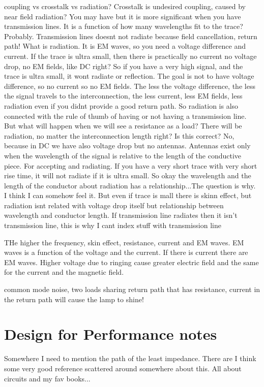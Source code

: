 \documentclass[12pt]{article}
\begin{document}
coupling vs crosstalk vs radiation?
Crosstalk is undesired coupling, caused by near field radiation?
You may have but it is more significant when you have transmission lines. It is a function of how many wavelengths fit to the trace? Probably. Transmission lines doesnt not radiate because field cancellation, return path! What is radiation. It is EM waves, so you need a voltage difference and current. If the trace is ultra small, then there is practically no current no voltage drop, no EM fields, like DC right? So if you have a very high signal, and the trace is ultra small, it wont radiate or reflection. The goal is not to have voltage difference, so no current so no EM fields. The less the voltage difference, the less the signal travels to the interconnection, the less current, less EM fields, less radiation even if you didnt provide a good return path. So radiation is also connected with the rule of thumb of having or not having a transmission line. But what will happen when we will see a resistance as a load? There will be radiation, no matter the interconnection length right? Is this correct? No, because in DC we have also voltage drop but no antennas. Antennas exist only when the wavelength of the signal is relative to the length of the conductive piece. For accepting and radiating. If you have a very short trace with very short rise time, it will not radiate if it is ultra small. So okay the wavelength and the length of the conductor about radiation has a relationship...The question is why. I think I can somehow feel it. But even if trace is mall there is skinn effect, but radiation isnt related with voltage drop itself but relationship between wavelength and conductor length. If transmission line radiates then it isn't transmission line, this is why I cant index stuff with transmission line

THe higher the frequency, skin effect, resistance, current and EM waves. EM waves is a function of the voltage and the current. If there is current there are EM waves. Higher voltage due to ringing cause greater electric field and the same for the current and the magnetic field.

common mode noise, two loads sharing return path that has resistance, current in the return path will cause the lamp to shine!

\section{Design for Performance notes}

Somewhere I need to mention the path of the least impedance. There are I think some very good reference scattered around somewhere about this. All about circuits and my fav books...
\end{document}
